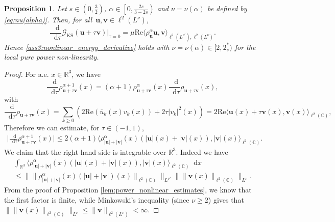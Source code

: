 \documentclass[12pt,a4paper]{amsart}
\newtheorem{prop}[theorem]{Proposition}
\numberwithin{equation}{section}
\newcommand{\ulu}{\boldsymbol{u}}
\newcommand{\ulv}{\boldsymbol{v}}
\newcommand*\diff{\mathop{}\!\mathrm{d}}
\newcommand{\twoasts}{{2^*_s}}
\begin{document}
	\begin{prop}
		Let $s\in(0,\frac32)$, $ \alpha \in \left[0, \frac{2s}{3-2s} \right) $ and $\nu=\nu(\alpha)$ be defined by \eqref{eq:nu(alpha)}. Then, for all~$ \ulu,\ulv\in\ell^2(L^{\nu}) $, 
		\begin{equation}
			\frac{\diff }{\diff \tau} \mathscr{G}_{\mathrm{KS}}(\ulu + \tau \ulv) |_{\tau = 0} = \mu \mathrm{Re} \langle \rho_{\ulu}^\alpha \ulu, \ulv \rangle_{\ell^2(L^{\nu^\prime}) , \ell^2(L^{\nu})} .
		\end{equation}
		Hence \ref{ass3:nonlinear_energy_derivative} holds with $\nu=\nu(\alpha)\in[2,\twoasts)$ for the local pure power non-linearity.
	\end{prop}
	\begin{proof}%
		For a.e. $x\in\mathbb{R}^3$, we have 
		\begin{equation}
			\frac{\diff }{\diff \tau}\rho_{\ulu+\tau\ulv}^{\alpha +1} (x)=(\alpha + 1) \rho_{\ulu + \tau \ulv}^{\alpha} (x) \frac{\diff }{\diff \tau} \rho_{\ulu + \tau \ulv}(x),
		\end{equation}
		with 
		\begin{equation*} 
			\frac{\diff }{\diff \tau} \rho_{\ulu + \tau \ulv}(x) = \sum_{k \geq 0} ( 2 \mathrm{Re} ( \overline{u}_k(x) v_k(x) ) + 2 \tau | v_k |^2(x) ) = 2 \mathrm{Re} \langle \ulu(x) + \tau \ulv(x) , \ulv(x)  \rangle_{\ell^2(\mathbb{C})} ,
		\end{equation*}
		Therefore we can estimate, for $\tau\in(-1,1)$,
		\begin{align}
			\Big|\frac{\diff }{\diff \tau}\rho_{\ulu+\tau\ulv}^{\alpha +1} (x)\Big|\le2(\alpha + 1) \langle \rho_{|\ulu|+ |\ulv|}^{\alpha} (x)(|\ulu|(x) + |\ulv|(x)) , |\ulv|(x)  \rangle_{\ell^2(\mathbb{C})}.
		\end{align}
		We claim that the right-hand side is integrable over $\mathbb{R}^3$. Indeed we have
		\begin{multline*}
			\int_{\mathbb{R}^3}\langle \rho_{|\ulu|+ |\ulv|}^{\alpha} (x)(|\ulu|(x) + |\ulv|(x)) , |\ulv|(x)  \rangle_{\ell^2(\mathbb{C})}\diff x\\
			\le\big\|\|\rho_{|\ulu|+ |\ulv|}^{\alpha}(x)(|\ulu| + |\ulv|)(x)\|_{\ell^2(\mathbb{C})}\big\|_{L^{\nu'}}\big\|\|\ulv(x)\|_{\ell^2(\mathbb{C})}\big\|_{L^\nu}.
		\end{multline*}
		From the proof of Proposition \ref{lem:power_nonlinear_estimates}, we know that the first factor is finite, while Minkowski's inequality (since $\nu\ge2$) gives that $\big\|\|\ulv(x)\|_{\ell^2(\mathbb{C})}\big\|_{L^\nu}\le\|\ulv\|_{\ell^2(L^\nu)}<\infty$.
		

\end{proof}
\end{document}
